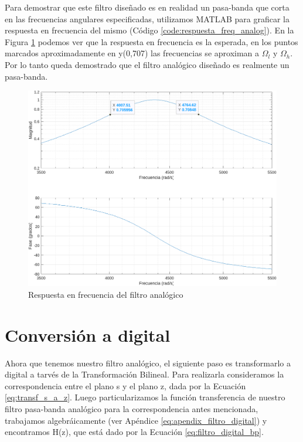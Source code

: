 Para demostrar que este filtro diseñado es en realidad un pasa-banda que corta en las frecuencias angulares especificadas, utilizamos MATLAB para graficar la respuesta en frecuencia del mismo (Código \ref{code:respuesta_freq_analog}). En la Figura \ref{fig:respuesta_freq_analog} podemos ver que la respuesta en frecuencia es la esperada, en los puntos marcados aproximadamente en y(0,707) las frecuencias se aproximan a $\Omega_l$ y $\Omega_h$. Por lo tanto queda demostrado que el filtro analógico diseñado es realmente un pasa-banda.

\begin{figure}[H]
  
\end{figure}

\begin{figure}[H]
  \centering
  \includegraphics[width=\linewidth]{images/respuesta_frecuencia_analog.png}
  \caption{Respuesta en frecuencia del filtro analógico}
  \label{fig:respuesta_freq_analog}
\end{figure}

\section{Conversión a digital}
Ahora que tenemos nuestro filtro analógico, el siguiente paso es transformarlo a digital a tarvés de la Transformación Bilineal. Para realizarla consideramos la correspondencia entre el plano s y el plano z, dada por la Ecuación \ref{eq:transf_s_a_z}. Luego particularizamos la función transferencia de nuestro filtro pasa-banda analógico para la correspondencia antes mencionada, trabajamos algebráicamente (ver Apéndice \ref{eq:apendix_filtro_digital}) y encontramos H(z), que está dado por la Ecuación \ref{eq:filtro_digital_bp}.


